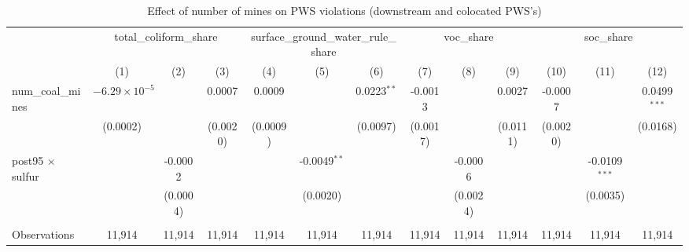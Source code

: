 
\begin{table}[htbp]
   \caption{\label{olsrf2sls_nummine_nonmine_vio_1985to2005dwnstrmcolocate} Effect of number of mines on PWS violations (downstream and colocated PWS's)}
   \bigskip
   \centering
   \begin{adjustbox}{width = \textwidth, center}
      \begin{tabular}{lcccccccccccc}
         \toprule
          & \multicolumn{3}{c}{total\_coliform\_share} & \multicolumn{3}{c}{surface\_ground\_water\_rule\_share} & \multicolumn{3}{c}{voc\_share} & \multicolumn{3}{c}{soc\_share}\\
                                                & (1)                    & (2)                   & (3)                   & (4)           & (5)            & (6)           & (7)           & (8)                   & (9)                   & (10)                  & (11)            & (12)\\  
         \midrule 
         num\_coal\_mines                       & $-6.29\times 10^{-5}$  &                       & 0.0007                & 0.0009        &                & 0.0223$^{**}$ & -0.0013       &                       & 0.0027                & -0.0007               &                 & 0.0499$^{***}$\\   
                                                & (0.0002)               &                       & (0.0020)              & (0.0009)      &                & (0.0097)      & (0.0017)      &                       & (0.0111)              & (0.0020)              &                 & (0.0168)\\   
         post95 $\times$ sulfur                 &                        & -0.0002               &                       &               & -0.0049$^{**}$ &               &               & -0.0006               &                       &                       & -0.0109$^{***}$ &   \\   
                                                &                        & (0.0004)              &                       &               & (0.0020)       &               &               & (0.0024)              &                       &                       & (0.0035)        &   \\   
          \\
         Observations                           & 11,914                 & 11,914                & 11,914                & 11,914        & 11,914         & 11,914        & 11,914        & 11,914                & 11,914                & 11,914                & 11,914          & 11,914\\  

\end{tabular}
\end{adjustbox}
\end{table}
